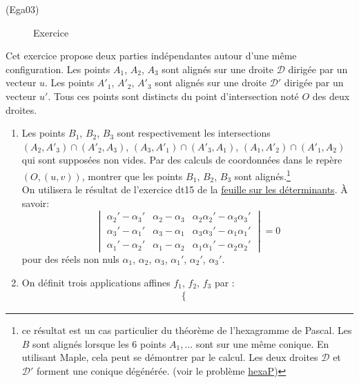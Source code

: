 \begin{tiny}(Ega03)\end{tiny}
\begin{figure}[ht]
 \centering
 
 \caption{Exercice }
 \label{fig:Ega03_1}
\end{figure}
Cet exercice propose deux parties indépendantes autour d'une même configuration.\newline
 Les points $A_1$, $A_2$, $A_3$ sont alignés sur une droite $\mathcal D$ dirigée par un vecteur $u$. Les points $A'_1$, $A'_2$, $A'_3$ sont alignés sur une droite $\mathcal D'$ dirigée par un vecteur $u'$. Tous ces points sont distincts du point d'intersection noté $O$ des deux droites. 
\begin{enumerate}
 \item Les points $B_1$, $B_2$, $B_3$ sont respectivement les intersections $(A_2,A'_3)\cap(A'_2,A_3)$, $(A_3,A'_1)\cap(A'_3,A_1)$, $(A_1,A'_2)\cap(A'_1,A_2)$ qui sont supposées non vides.\newline
Par des calculs de coordonnées dans le repère $(O,(u,v))$, montrer que les points $B_1$, $B_2$, $B_3$ sont alignés.\footnote{ce résultat est un cas particulier du théorème de l'hexagramme de Pascal. Les $B$ sont alignés lorsque les $6$ points $A_1,...$ sont sur une même conique. En utilisant Maple, cela peut se démontrer par le calcul. Les deux droites $\mathcal{D}$ et $\mathcal{D'}$ forment une conique dégénérée. (voir le problème \href{http://back.maquisdoc.net/data/devoirs_nicolair/AhexaP.pdf}{hexaP})}\\
On utilisera le résultat de l'exercice dt15 de la \href{\exosurl _fex_dt.pdf}{feuille sur les déterminants}. \`A savoir:
\begin{displaymath}
 \begin{vmatrix}
 \alpha_2'-\alpha_3' & \alpha_2 - \alpha_3 & \alpha_2\alpha_2'-\alpha_3\alpha_3' \\
 \alpha_3'-\alpha_1' & \alpha_3 - \alpha_1 & \alpha_3\alpha_3'-\alpha_1\alpha_1' \\
 \alpha_1'-\alpha_2' & \alpha_1 - \alpha_2 & \alpha_1\alpha_1'-\alpha_2\alpha_2'
\end{vmatrix}
=0
\end{displaymath}
pour des réels non nuls $\alpha_1$, $\alpha_2$, $\alpha_3$, $\alpha_1'$, $\alpha_2'$, $\alpha_3'$.
\item On définit trois applications affines $f_1$, $f_2$, $f_3$ par :
\begin{align*}
 \left\lbrace \begin{aligned}

\end{aligned}
\end{align*}
\end{enumerate}
